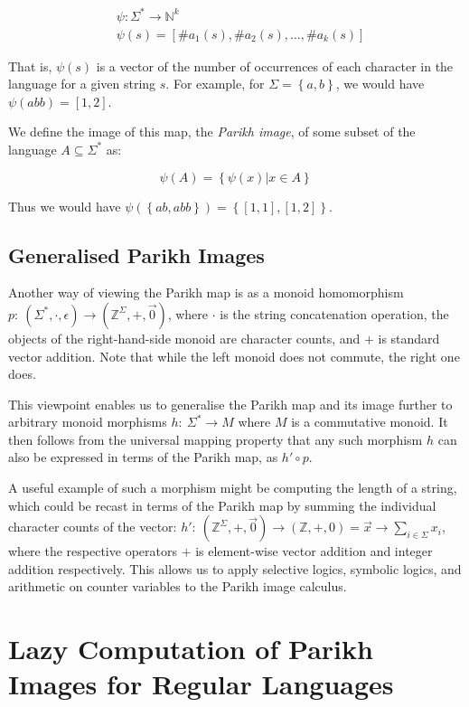 \documentclass[runningheads]{llncs}
\begin{document}
$$
\begin{aligned}
& \psi: \Sigma^* \rightarrow \mathbb{N}^k \\
& \psi(s) = \left[\#a_1(s), \#a_2(s), \ldots, \#a_k(s)\right]
\end{aligned}
$$

That is, $\psi(s)$ is a vector of the number of occurrences of each character in the language for a given string $s$. For example, for  $\Sigma = \left \{ a, b\right\}$, we would have $\psi(abb) = \left[1, 2\right]$.

We define the image of this map, the \textit{Parikh image}, of some subset of the language $A \subseteq \Sigma^*$ as:

$$
\psi(A) = \left\{ \psi(x) | x \in A \right\}
$$

Thus we would have $\psi(\left\{ab, abb\right\}) = \left\{\left[1, 1\right], \left[1, 2\right]\right\}$.

\subsection{Generalised Parikh Images}\label{sec:generalised}

Another way of viewing the Parikh map is as a monoid homomorphism $p:\: \left(\Sigma^*, \cdot, \epsilon \right) \to (\mathbb{Z}^\Sigma, +, \vec{0})$, where $\cdot$ is the string concatenation operation, the objects of the right-hand-side monoid are character counts, and $+$ is standard vector addition. Note that while the left monoid does not commute, the right one does.

This viewpoint enables us to generalise the Parikh map and its image further to arbitrary monoid morphisms $h:\: \Sigma^* \to M$ where $M$ is a commutative monoid. It then follows from the universal mapping property that any such morphism $h$ can also be expressed in terms of the Parikh map, as $h' \circ p$.

A useful example of such a morphism might be computing the length of a string,
which could be recast in terms of the Parikh map by summing the individual
character counts of the vector: $h':\: (\mathbb{Z}^\Sigma, +, \vec{0}) \to
(\mathbb{Z}, +, 0) = \vec{x} \to \sum_{i \in \Sigma} x_i$, where the respective
operators $+$ is element-wise vector addition and integer addition respectively.
This allows us to apply selective logics, symbolic logics, and arithmetic on
counter variables to the Parikh image calculus.

\section{Lazy Computation of Parikh Images for Regular Languages}
\end{document}
